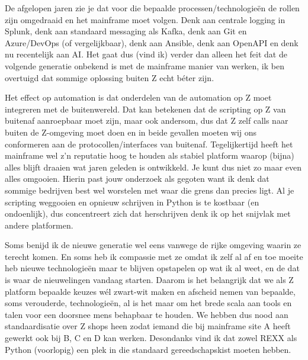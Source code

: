 De afgelopen jaren zie je dat voor die bepaalde processen/technologieën de rollen zijn omgedraaid en het mainframe moet volgen. Denk aan centrale logging in Splunk, denk aan standaard messaging als Kafka, denk aan Git en Azure/DevOps (of vergelijkbaar), denk aan Ansible, denk aan OpenAPI en denk nu recentelijk aan AI. Het gaat dus (vind ik) verder dan alleen het feit dat de volgende generatie onbekend is met de mainframe manier van werken, ik ben overtuigd dat sommige oplossing buiten Z echt béter zijn.

Het effect op automation is dat onderdelen van de automation op Z moet integreren met de buitenwereld. Dat kan betekenen dat de scripting op Z van buitenaf aanroepbaar moet zijn, maar ook andersom, dus dat Z zelf calls naar buiten de Z-omgeving moet doen en in beide gevallen moeten wij ons conformeren aan de protocollen/interfaces van buitenaf. Tegelijkertijd heeft het mainframe wel z'n reputatie hoog te houden als stabiel platform waarop (bijna) alles blijft draaien wat jaren geleden is ontwikkeld. Je kunt dus niet zo maar even alles omgooien. Hierin past jouw onderzoek als gegoten want ik denk dat sommige bedrijven best wel worstelen met waar die grens dan precies ligt. Al je scripting weggooien en opnieuw schrijven in Python is te kostbaar (en ondoenlijk), dus concentreert zich dat herschrijven denk ik op het snijvlak met andere platformen.

Soms benijd ik de nieuwe generatie wel eens vanwege de rijke omgeving waarin ze terecht komen. En soms heb ik compassie met ze omdat ik zelf al af en toe moeite heb nieuwe technologieën maar te blijven opstapelen op wat ik al weet, en de dat is waar de nieuwelingen vandaag starten. Daarom is het belangrijk dat we als Z platform bepaalde keuzes wél zwart-wit maken en afscheid nemen van bepaalde, soms verouderde, technologieën, al is het maar om het brede scala aan tools en talen voor een doorsnee mens behapbaar te houden. We hebben dus nood aan standaardisatie over Z shops heen zodat iemand die bij mainframe site A heeft gewerkt ook bij B, C en D kan werken.
Desondanks vind ik dat zowel REXX als Python (voorlopig) een plek in die standaard gereedschapskist moeten hebben.
